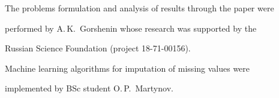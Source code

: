 









\vspace*{-14pt}



\Ack

\noindent

The problems formulation and analysis of results through the paper were 

performed by A.\,K.~Gorshenin whose research was supported by the 

Russian Science Foundation (project 18-71-00156). 

Machine learning algorithms for imputation of missing values were 

implemented by BSc student O.\,P.~Martynov.








